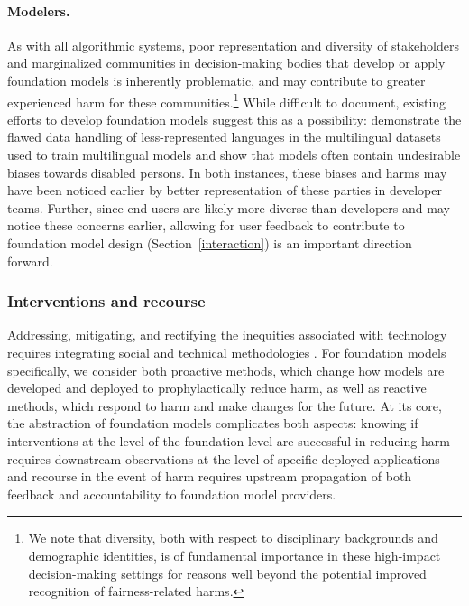 \paragraph{Modelers.}
As with all algorithmic systems, poor representation and diversity of stakeholders and marginalized communities in decision-making bodies that develop or apply foundation models is inherently problematic, and may contribute to greater experienced harm for these communities.\footnote{We note that diversity, both with respect to disciplinary backgrounds and demographic identities, is of fundamental importance in these high-impact decision-making settings for reasons well beyond the potential improved recognition of fairness-related harms.} While difficult to document, existing efforts to develop foundation models suggest this as a possibility: 
\citet{caswell2021} demonstrate the flawed data handling of less-represented languages in the multilingual datasets used to train multilingual models and \citet{hutchinson2020} show that models often contain undesirable biases towards disabled persons. In both instances, these biases and harms may have been noticed earlier by better representation of these parties in developer teams. Further, since end-users are likely more diverse than developers and may notice these concerns earlier, allowing for user feedback to contribute to foundation model design (Section~\ref{interaction}) is an important direction forward.

\subsubsection{Interventions and recourse}
\label{sec:fairness-recourse}

Addressing, mitigating, and rectifying the inequities associated with technology requires  integrating social and technical methodologies \citep{Abebe2020}. For foundation models specifically, we consider both proactive methods, which change how models are developed and deployed to prophylactically reduce harm, as well as reactive methods, which respond to harm and make changes for the future. At its core, the abstraction of foundation models complicates both aspects: knowing if interventions at the level of the foundation level are successful in reducing harm requires downstream observations at the level of specific deployed applications and recourse in the event of harm requires upstream propagation of both feedback and accountability to foundation model providers.


